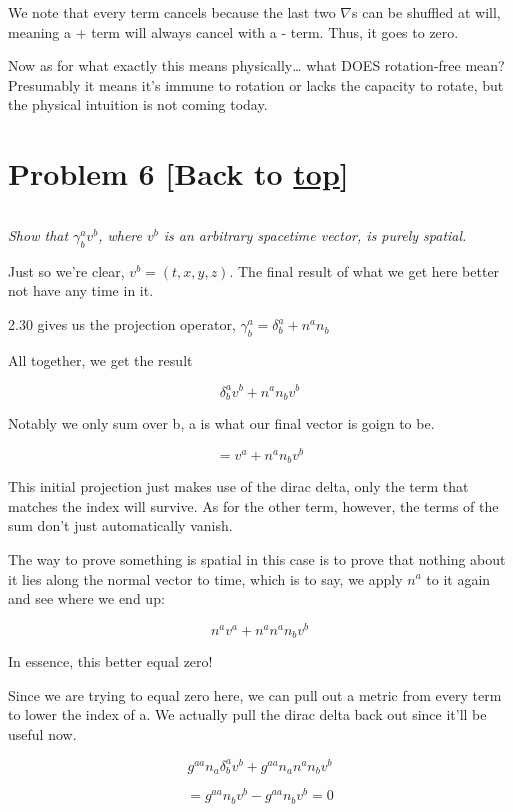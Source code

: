 \documentclass[landscape,letterpaper,10pt,english]{article}
\begin{document}
We note that every term cancels because the last two \(\nabla\)s can be
shuffled at will, meaning a + term will always cancel with a - term.
Thus, it goes to zero.

Now as for what exactly this means physically\ldots{} what DOES
rotation-free mean? Presumably it means it's immune to rotation or lacks
the capacity to rotate, but the physical intuition is not coming today.

    \hypertarget{problem-6-back-to-top}{%
\section{\texorpdfstring{Problem 6 {[}Back to
\hyperref[toc]{top}{]}}{Problem 6 {[}Back to {]}}}\label{problem-6-back-to-top}}

\[\label{P6}\]

\emph{Show that \(\gamma^a_b v^b\), where \(v^b\) is an arbitrary
spacetime vector, is purely spatial.}

Just so we're clear, \(v^b = (t,x,y,z).\) The final result of what we
get here better not have any time in it.

2.30 gives us the projection operator,
\(\gamma^a_b = \delta^a_b + n^an_b\)

    All together, we get the result

\[ \delta^a_b v^b + n^an_bv^b \]

Notably we only sum over b, a is what our final vector is goign to be.

\[ = v^a + n^an_bv^b \]

This initial projection just makes use of the dirac delta, only the term
that matches the index will survive. As for the other term, however, the
terms of the sum don't just automatically vanish.

    The way to prove something is spatial in this case is to prove that
nothing about it lies along the normal vector to time, which is to say,
we apply \(n^a\) to it again and see where we end up:

\[ n^av^a + n^an^an_bv^b \]

In essence, this better equal zero!

    Since we are trying to equal zero here, we can pull out a metric from
every term to lower the index of a. We actually pull the dirac delta
back out since it'll be useful now.

\[ g^{aa}n_a \delta^a_b v^b + g^{aa}n_an^an_bv^b \]

\[ = g^{aa}n_b v^b - g^{aa}n_bv^b = 0 \]
\end{document}
